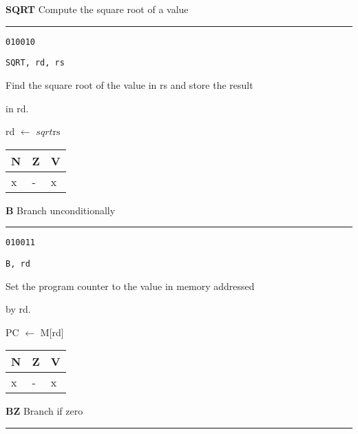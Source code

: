 \documentclass{article}
\begin{document}
\pagebreak

\flushleft
\LARGE\textbf{SQRT} \large \hfill Compute the square root of a value

\kern-3pt
\noindent\rule{16.5cm}{0.4pt}
\normalsize

{\large
	 \texttt{010010} \par
	\smallbreak
	 \texttt{SQRT, rd, rs} \par
	\smallbreak
	 Find the square root of the value in rs and store the result \par
	\makebox[3.5cm][l]{  } in rd. \par
	\smallbreak
	 rd $\leftarrow$ $sqrt{\textrm{rs}}$ \par
	\smallbreak
	 \begin{tabular}{lll} N \quad & Z \quad & V \\ \hline x & - & x \\ \end{tabular}
}

\bigskip\bigskip

\flushleft
\LARGE\textbf{B} \large \hfill Branch unconditionally

\kern-3pt
\noindent\rule{16.5cm}{0.4pt}
\normalsize

{\large
	 \texttt{010011} \par
	\smallbreak
	 \texttt{B, rd} \par
	\smallbreak
	 Set the program counter to the value in memory addressed  \par
	\makebox[3.5cm][l]{  } by rd. \par
	\smallbreak
	 PC $\leftarrow$ M[rd] \par
	\smallbreak
	 \begin{tabular}{lll} N \quad & Z \quad & V \\ \hline x & - & x \\ \end{tabular}
}

\bigskip\bigskip

\flushleft
\LARGE\textbf{BZ} \large \hfill Branch if zero

\kern-3pt
\noindent\rule{16.5cm}{0.4pt}
\normalsize
\end{document}
